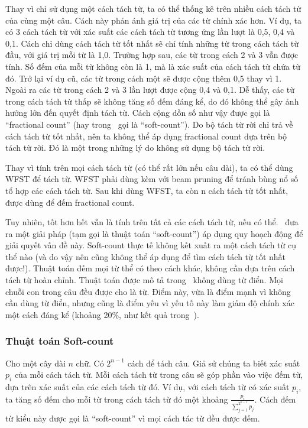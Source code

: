 \documentclass[a4paper,oneside,14pt]{extbook} %
\begin{document}
Thay vì chỉ sử dụng một cách tách từ, ta có thể thống kê trên nhiều
cách tách từ của cùng một câu. Cách này phản ánh
giá trị của các từ chính xác hơn. Ví dụ, ta có 3 cách tách từ với xác
suất các cách tách từ tương ứng lần lượt là 0,5, 0,4 và 0,1. Cách chỉ
dùng cách tách từ tốt nhất sẽ chỉ tính những từ trong cách tách từ
đầu, với giá trị mỗi từ là 1,0. 
Trường hợp sau, các từ trong cách 2 và 3 vẫn được
tính. Số đếm của mỗi từ không còn là 1, mà là xác suất của cách tách
từ chứa từ đó. Trở lại ví dụ cũ, các từ trong cách một sẽ được cộng thêm
0,5 thay vì 1. Ngoài ra các từ trong cách 2 và 3 lần lượt được cộng
0,4 và 0,1. Dễ thấy, các từ trong cách tách từ thấp sẽ không tăng số
đếm đáng kể, do đó không thể gây ảnh hưởng lớn đến quyết định tách
từ.
Cách cộng dồn số như vậy được gọi là ``fractional count'' (hay
trong~\cite{softcount} gọi là ``soft-count''). Do bộ tách từ rời chỉ
trả về cách tách từ tốt nhất, nên ta không thể áp dụng fractional
count dựa trên bộ tách từ rời. Đó là một trong những lý do không sử
dụng bộ tách từ rời.

Thay vì tính trên mọi cách tách từ (có thể rất lớn nếu câu dài), ta có
thể dùng WFST
 để tách  
từ. WFST phải dùng kèm với beam pruning để tránh bùng nổ số tổ hợp các
cách tách từ. Sau khi dùng WFST, ta còn n cách tách từ tốt nhất, được
dùng để đếm fractional count.


Tuy nhiên, tốt hơn hết vẫn là tính trên tất cả các cách tách từ, nếu có
thể. \cite{softcount}~đưa ra một giải pháp (tạm gọi là thuật toán
``soft-count'') áp dụng quy hoạch động để giải quyết vấn đề này.
Soft-count thực tế không kết xuất ra một cách tách từ cụ thể nào (và
do vậy nên 
cũng không thể áp dụng để tìm cách tách từ tốt nhất được!). Thuật toán
đếm mọi từ thể có theo cách khác, không cần dựa trên cách tách từ hoàn
chỉnh. Thuật toán được mô tả trong~\cite{softcount} không dùng từ điển. Mọi chuỗi con trong câu đều được
cho là từ. Điểm này, vừa là điểm mạnh vì không cần dùng từ
điển, nhưng cũng là điểm yếu vì yếu tố này làm giảm độ chính xác một
cách đáng kể (khoảng 20\%, như kết quả trong~\cite{softcount}).


\subsubsection{Thuật toán Soft-count}

Cho một cây dài $n$ chữ. Có $2^{n-1}$ cách để tách câu. Giả sử chúng
ta biết xác suất $p_i$ của mỗi cách tách từ. Mỗi cách tách từ trong
câu sẽ góp phần vào việc đếm từ, dựa trên xác suất của các cách tách
từ đó. Ví dụ, với cách tách từ có xác suất $p_i$, ta tăng số đếm cho
mỗi từ trong cách tách từ đó một khoảng
$\frac{p_i}{\sum_{j=1}^{2^{n-1}}p_j}$. Cách đếm từ kiểu
này được gọi là ``soft-count'' vì mọi cách tác từ đều được đếm. 
\end{document}
